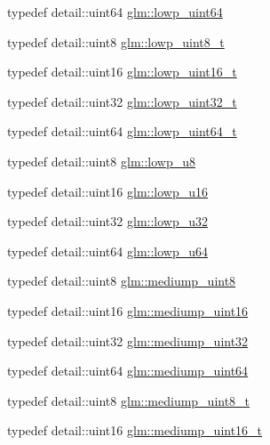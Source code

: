\begin{DoxyCompactItemize}
\item 
typedef detail\+::uint64 \hyperlink{group__gtc__type__precision_gacf666a9d9b309c4615c7a4f2ab0be289}{glm\+::lowp\+\_\+uint64}
\item 
typedef detail\+::uint8 \hyperlink{group__gtc__type__precision_ga0910ef24195d1b8b26e34d73148c0c45}{glm\+::lowp\+\_\+uint8\+\_\+t}
\item 
typedef detail\+::uint16 \hyperlink{group__gtc__type__precision_ga9a71176a4e5bc61951f9e9197d9c80e1}{glm\+::lowp\+\_\+uint16\+\_\+t}
\item 
typedef detail\+::uint32 \hyperlink{group__gtc__type__precision_ga9f8cb602a358e1f48bda2682cf051f0c}{glm\+::lowp\+\_\+uint32\+\_\+t}
\item 
typedef detail\+::uint64 \hyperlink{group__gtc__type__precision_gabf3069d4f188557a87b1d7f35eb0a270}{glm\+::lowp\+\_\+uint64\+\_\+t}
\item 
typedef detail\+::uint8 \hyperlink{group__gtc__type__precision_gae63f942c49a30dbf266b2f13f3efe257}{glm\+::lowp\+\_\+u8}
\item 
typedef detail\+::uint16 \hyperlink{group__gtc__type__precision_ga22c5364f27caa0a6eb0627cbc21e46be}{glm\+::lowp\+\_\+u16}
\item 
typedef detail\+::uint32 \hyperlink{group__gtc__type__precision_gaba06fae1dd98ca50c017e68345df0365}{glm\+::lowp\+\_\+u32}
\item 
typedef detail\+::uint64 \hyperlink{group__gtc__type__precision_ga61ed4c68a4cffb77cd63cc107119123a}{glm\+::lowp\+\_\+u64}
\item 
typedef detail\+::uint8 \hyperlink{group__gtc__type__precision_gac4b849eaac0543a10f97f4bdda4850a8}{glm\+::mediump\+\_\+uint8}
\item 
typedef detail\+::uint16 \hyperlink{group__gtc__type__precision_ga2cef3a0d7b0fce75c9885f64656d8933}{glm\+::mediump\+\_\+uint16}
\item 
typedef detail\+::uint32 \hyperlink{group__gtc__type__precision_ga861dbd1051f488e425b3966001b568e5}{glm\+::mediump\+\_\+uint32}
\item 
typedef detail\+::uint64 \hyperlink{group__gtc__type__precision_ga6685788d15d0a973ee7c2460d0456dc1}{glm\+::mediump\+\_\+uint64}
\item 
typedef detail\+::uint8 \hyperlink{group__gtc__type__precision_gadfa38f3c245d371c4b2079f1fd68928b}{glm\+::mediump\+\_\+uint8\+\_\+t}
\item 
typedef detail\+::uint16 \hyperlink{group__gtc__type__precision_ga0b385466deac5ac96061ef2cdd6db20f}{glm\+::mediump\+\_\+uint16\+\_\+t}

\end{DoxyCompactItemize}
